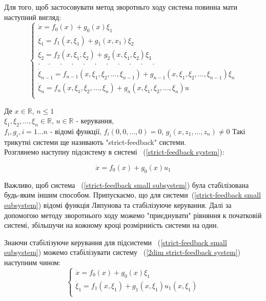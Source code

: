 \documentclass{article}
\begin{document}
Для того, щоб застосовувати метод зворотньго ходу система повинна мати наступний вигляд:
\begin{equation} \label{strict-feedback system}
    \begin{cases}
        \dot x           = f_0(x)+g_0(x)\xi_1\\
        \dot \xi_1       = f_1(x, \xi_1)+g_{1}(x, x_1)\xi_2 \\
        \dot \xi_2       = f_2(x, \xi_1, \xi_2) + g_2(x, \xi_1, \xi_2)\xi_3 \\
       \cdot \quad \cdot \quad \cdot \quad \cdot  \quad \cdot  \quad \cdot
        \quad \cdot  \quad \cdot  \quad \cdot  \quad \cdot  \quad \cdot\\

       \dot \xi_{n-1}   = f_{n-1}(x, \xi_1, \xi_2, ... ,\xi_{n-1}) 
        +g_{n-1}(x, \xi_1, \xi_2, ... ,\xi_{n-1}) \xi_n\\
        \dot \xi_{n}     = f_{n}(x, \xi_1, \xi_2, ... ,\xi_{n}) 
        +g_{n}(x, \xi_1, \xi_2, ... ,\xi_{n})u\\

	\end{cases}
\end{equation}


Де $x \in \mathbb{R}$, $n \leq 1$\\
$\xi_1, \xi_2, ... ,\xi_n \in \mathbb{R}$, $u \in \mathbb{R}$ - керування,\\ 
$f_i, g_i, i = 1 ... n $ -  відомі функції, $f_i(0,0, \dots, 0) = 0$, 
$g_i(x,z_1, \dots, z_n) \neq 0$
Такі трикутні системи ще називають "strict-feedback" системи.\\
Розглянемо наступну підсистему в системі ~(\ref{strict-feedback system}):

\begin{equation} \label{strict-feedback small subsystem}
\dot x = f_0(x)+g_0(x)u_1
\end{equation}

Важливо, щоб система ~(\ref{strict-feedback small subsystem}) була стабілізована будь-яким іншим способом.
Припускаємо, що для системи~(\ref{strict-feedback small subsystem}) 
відомі функція Ляпунова та стабілізуюче керування.
Далі за допомогою методу зворотнього ходу можемо "приєднувати" рівняння к початковій системі, 
збільшучи на кожному кроці розмірниість системи на один. 

Знаючи стабілізуюче керування для підсистеми  ~(\ref{strict-feedback small subsystem})
можемо стабілізувати систему ~(\ref{2dim strict-feedback system}) наступним чином:
\begin{equation} \label{2dim strict-feedback system}
    \begin{cases}
    \dot x = f_0(x)+g_0(x)\xi_1\\
    \dot \xi_1 = f_1(x,\xi_1)+g_1(x,\xi_1)u_1(x,\xi_1)\\
    \end{cases}
\end{equation}
\end{document}

